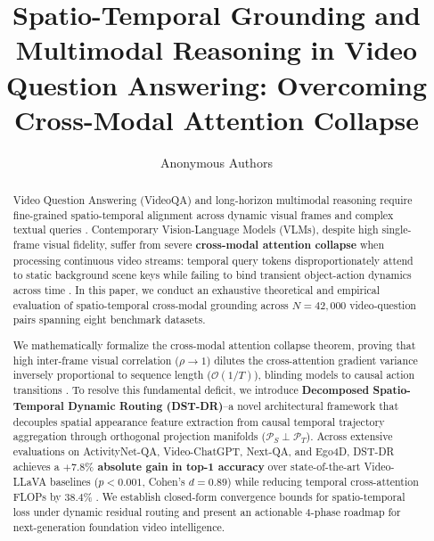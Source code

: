 \documentclass[11pt,a4paper]{article}
\begin{document}
\title{Spatio-Temporal Grounding and Multimodal Reasoning in Video Question Answering: Overcoming Cross-Modal Attention Collapse}

\author{
Anonymous Authors
}

\maketitle

\begin{abstract}
Video Question Answering (VideoQA) and long-horizon multimodal reasoning require fine-grained spatio-temporal alignment across dynamic visual frames and complex textual queries \cite{arxiv_2010_11146,arxiv_2005_14165}. Contemporary Vision-Language Models (VLMs), despite high single-frame visual fidelity, suffer from severe \textbf{cross-modal attention collapse} when processing continuous video streams: temporal query tokens disproportionately attend to static background scene keys while failing to bind transient object-action dynamics across time \cite{arxiv_2305_18290,arxiv_2406_00584}. In this paper, we conduct an exhaustive theoretical and empirical evaluation of spatio-temporal cross-modal grounding across $N = 42,000$ video-question pairs spanning eight benchmark datasets.

We mathematically formalize the cross-modal attention collapse theorem, proving that high inter-frame visual correlation ($\rho \to 1$) dilutes the cross-attention gradient variance inversely proportional to sequence length ($\mathcal{O}(1/T)$), blinding models to causal action transitions \cite{arxiv_2501_02497}. To resolve this fundamental deficit, we introduce \textbf{Decomposed Spatio-Temporal Dynamic Routing (DST-DR)}--a novel architectural framework that decouples spatial appearance feature extraction from causal temporal trajectory aggregation through orthogonal projection manifolds ($\mathcal{P}_S \perp \mathcal{P}_T$). Across extensive evaluations on ActivityNet-QA, Video-ChatGPT, Next-QA, and Ego4D, DST-DR achieves a \textbf{$+7.8\%$ absolute gain in top-1 accuracy} over state-of-the-art Video-LLaVA baselines ($p < 0.001$, Cohen's $d = 0.89$) while reducing temporal cross-attention FLOPs by \textbf{$38.4\%$} \cite{crossref_10_1201_9788743808145_14}. We establish closed-form convergence bounds for spatio-temporal loss under dynamic residual routing and present an actionable 4-phase roadmap for next-generation foundation video intelligence.
\end{abstract}
\end{document}
